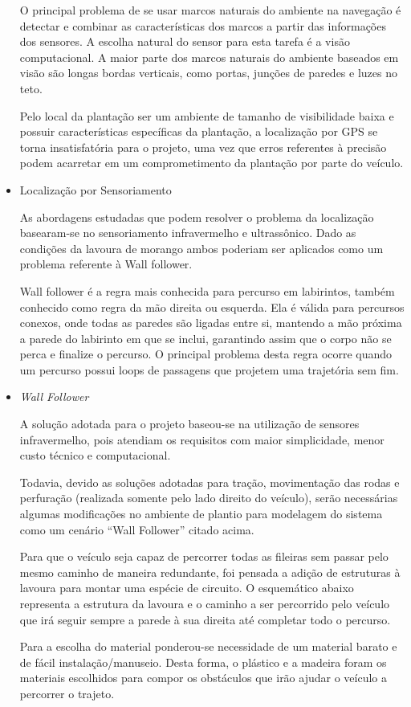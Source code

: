 \begin{itemize}
O principal problema de se usar marcos naturais do ambiente na
navegação é detectar e combinar as características dos marcos
 a partir das informações dos sensores. A escolha natural do sensor
 para esta tarefa é a visão computacional. A maior parte dos marcos
 naturais do ambiente baseados em visão são longas bordas verticais,
como portas, junções de paredes e luzes no teto.

Pelo local da plantação ser um ambiente de tamanho de visibilidade
baixa e possuir características específicas da plantação, a localização
por GPS se torna insatisfatória para o projeto, uma vez que erros
referentes à precisão podem acarretar em um comprometimento da plantação
por parte do veículo.


\item Localização por Sensoriamento

As abordagens estudadas que podem resolver o problema da localização
basearam-se no sensoriamento infravermelho e ultrassônico.
Dado as condições da lavoura de morango ambos poderiam ser
aplicados como um problema referente à Wall follower.

Wall follower é a regra mais conhecida para percurso em labirintos,
também conhecido como regra da mão direita ou esquerda.
Ela é válida para percursos conexos, onde todas as paredes são
ligadas entre si, mantendo a mão próxima a parede do labirinto em
que se inclui, garantindo assim que o corpo não se perca e finalize o percurso. O principal problema desta regra ocorre quando um percurso possui loops de passagens que projetem uma trajetória sem fim.


\item \textit{Wall Follower}

A solução adotada para o projeto baseou-se na utilização de sensores
infravermelho, pois atendiam os requisitos com maior simplicidade,
menor custo técnico e computacional.

Todavia, devido as soluções adotadas para tração, movimentação das
rodas e perfuração (realizada somente pelo lado direito do veículo),
serão necessárias algumas modificações no ambiente de plantio para modelagem
do sistema como um cenário “Wall Follower” citado acima.

Para que o veículo seja capaz de percorrer todas as fileiras sem passar
 pelo mesmo caminho de maneira redundante, foi pensada a adição de
 estruturas à lavoura para montar uma espécie de circuito. O esquemático
  abaixo representa a estrutura da lavoura e o caminho a ser percorrido pelo
   veículo que irá seguir sempre a parede à sua direita até completar todo o
   percurso.

   Para a escolha do material ponderou-se necessidade de um material
   barato e de fácil instalação/manuseio. Desta forma, o plástico e
   a madeira foram os materiais escolhidos para compor os obstáculos
   que irão ajudar o veículo a percorrer o trajeto.

\end{itemize}


